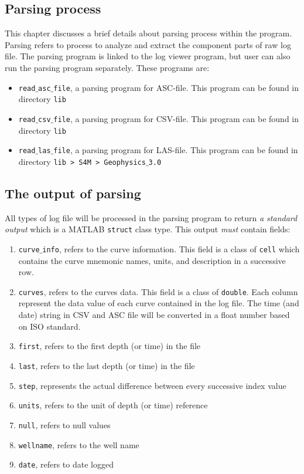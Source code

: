 \documentclass[12pt,a4paper,oneside]{report}
\begin{document}
\begin{appendices}

\chapter{Parsing process}
\label{ch:parsing}
This chapter discusses a brief details about parsing process within the program. Parsing refers to process to analyze and extract the component parts of raw log file. The parsing program is linked to the log viewer program, but user can also run the parsing program separately. These programs are:
\begin{itemize}
\item \texttt{read$\_$asc$\_$file}, a parsing program for ASC-file. This program can be found in directory \texttt{lib}
\item \texttt{read$\_$csv$\_$file}, a parsing program for CSV-file. This program can be found in directory \texttt{lib}
\item \texttt{read$\_$las$\_$file}, a parsing program for LAS-file. This program can be found in directory \texttt{lib > S4M > Geophysics$\_$3.0}
\end{itemize}
 

\section{The output of parsing}
All types of log file will be processed in the parsing program to return \emph{a standard output} which is a MATLAB \texttt{struct} class type. This output \emph{must} contain fields:
\begin{enumerate}
\setlength\itemsep{0.08em}
\item \texttt{curve$\_$info}, refers to the curve information. This field is a class of \texttt{cell} which contains the curve mnemonic names, units, and description in a successive row.
\item \texttt{curves}, refers to the curves data. This field is a class of \texttt{double}. Each column represent the data value of each curve contained in the log file. The time (and date) string in CSV and ASC file will be converted in a float number based on ISO standard.
\item \texttt{first}, refers to the first depth (or time) in the file
\item \texttt{last}, refers to the last depth (or time) in the file
\item \texttt{step},  represents the actual difference between every successive index value
\item \texttt{units}, refers to the unit of depth (or time) reference
\item \texttt{null}, refers to null values
\item \texttt{wellname}, refers to the well name
\item \texttt{date}, refers to date logged
\end{enumerate}


\end{appendices}
\end{document}

